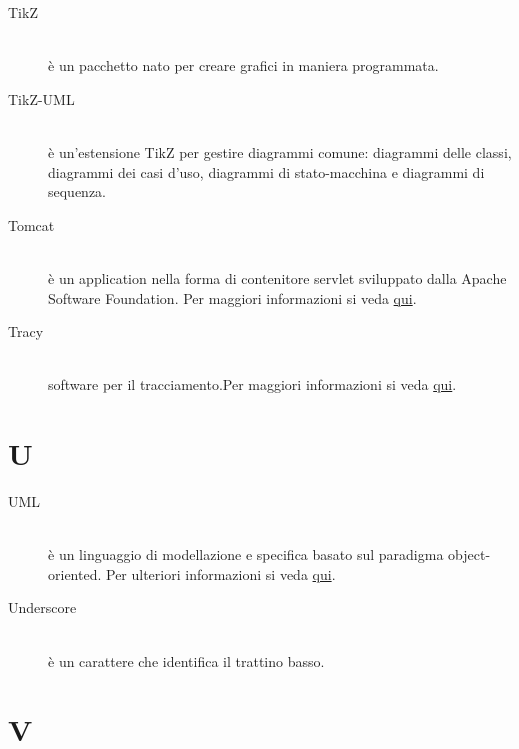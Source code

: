 \documentclass[12pt,a4paper]{article}
\begin{document}
\begin{description}
\item[TikZ] 
\hfill\\è un pacchetto  nato per creare grafici in maniera programmata.

\item[TikZ-UML] 
\hfill\\è un'estensione TikZ per gestire diagrammi  comune: diagrammi delle classi, diagrammi dei casi d'uso, diagrammi di stato-macchina e diagrammi di sequenza.

\item[Tomcat] 
\hfill\\è un application  nella forma di contenitore servlet  sviluppato dalla Apache Software Foundation. Per maggiori informazioni si veda \href{https://it.wikipedia.org/wiki/Apache_Tomcat}{qui}.

\item[Tracy] 
\hfill\\software {} per il tracciamento.Per maggiori informazioni si veda \href{http://tracy-tpiga.rhcloud.com/tracy/}{qui}.
\end{description}

\newpage

\section{U}

\begin{description}
\item[UML] 
\hfill\\è un linguaggio di modellazione e specifica basato sul paradigma object-oriented. Per ulteriori informazioni si veda \href{http://it.wikipedia.org/wiki/Unified_Modeling_Language}{qui}.

\item[Underscore] 
\hfill\\è un carattere che identifica il trattino basso.
\end{description}

\newpage

\section{V}
\end{document}
